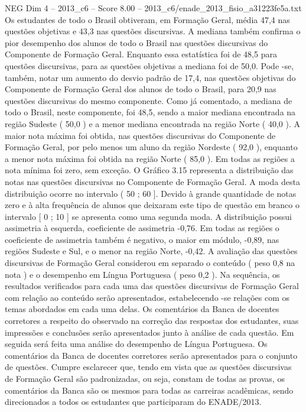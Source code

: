 \begin{textsample}{NEG Dim 4 – 2013\_c6 – Score 8.00 – 2013\_c6/enade\_2013\_fisio\_a31223fe5a.txt}
Os estudantes de todo o Brasil obtiveram, em Formação Geral, média 47,4 nas questões objetivas e 43,3 nas questões discursivas.
A mediana também confirma o pior desempenho dos alunos de todo o Brasil nas questões discursivas do Componente de Formação Geral.
Enquanto essa estatística foi de 48,5 para questões discursivas, para as questões objetivas a mediana foi de 50,0.
Pode -se, também, notar um aumento do desvio padrão de 17,4, nas questões objetivas do Componente de Formação Geral dos alunos de todo o Brasil, para 20,9 nas questões discursivas do mesmo componente.
Como já comentado, a mediana de todo o Brasil, neste componente, foi 48,5, sendo a maior mediana encontrada na região Sudeste ( 50,0 ) e a menor mediana encontrada na região Norte ( 40,0 ).
A maior nota máxima foi obtida, nas questões discursivas do Componente de Formação Geral, por pelo menos um aluno da região Nordeste ( 92,0 ), enquanto a menor nota máxima foi obtida na região Norte ( 85,0 ).
Em todas as regiões a nota mínima foi zero, sem exceção.
O Gráfico 3.15 representa a distribuição das notas nas questões discursivas no Componente de Formação Geral.
A moda desta distribuição ocorre no intervalo ( 50 ; 60 ].
Devido à grande quantidade de notas zero e à alta frequência de alunos que deixaram este tipo de questão em branco o intervalo [ 0 ; 10 ] se apresenta como uma segunda moda.
A distribuição possui assimetria à esquerda, coeficiente de assimetria -0,76.
Em todas as regiões o coeficiente de assimetria também é negativo, o maior em módulo, -0,89, nas regiões Sudeste e Sul, e o menor na região Norte, -0,42.
A avaliação das questões discursivas de Formação Geral considerou em separado o conteúdo ( peso 0,8 na nota ) e o desempenho em Língua Portuguesa ( peso 0,2 ).
Na sequência, os resultados verificados para cada uma das questões discursivas de Formação Geral com relação ao conteúdo serão apresentados, estabelecendo -se relações com os temas abordados em cada uma delas.
Os comentários da Banca de docentes corretores a respeito do observado na correção das respostas dos estudantes, suas impressões e conclusões serão apresentados junto à análise de cada questão.
Em seguida será feita uma análise do desempenho de Língua Portuguesa.
Os comentários da Banca de docentes corretores serão apresentados para o conjunto de questões.
Cumpre esclarecer que, tendo em vista que as questões discursivas de Formação Geral são padronizadas, ou seja, constam de todas as provas, os comentários da Banca são os mesmos para todas as carreiras acadêmicas, sendo direcionados a todos os estudantes que participaram do ENADE/2013.

\end{textsample}

